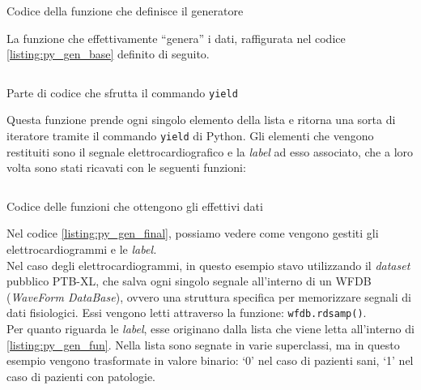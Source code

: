 \begin{listing}[H]
    \inputminted{python}{code/generator_fun.py}
    \caption{Codice della funzione che definisce il generatore}
    \label{listing:py_gen_fun}
\end{listing}\noindent
La funzione che effettivamente ``genera'' i dati, raffigurata nel codice \ref{listing:py_gen_base} definito di seguito.
\begin{listing}[H]
    \inputminted{python}{code/generator_base.py}
    \caption{Parte di codice che sfrutta il commando \texttt{yield}}
    \label{listing:py_gen_base}
\end{listing}\noindent
Questa funzione prende ogni singolo elemento della lista e ritorna una sorta di iteratore tramite il commando \texttt{yield} di Python.
Gli elementi che vengono restituiti sono il segnale elettrocardiografico e la \textit{label} ad esso associato, che a loro volta sono stati ricavati con le seguenti funzioni:
\begin{listing}[H]
    \inputminted{python}{code/generator_final.py}
    \caption{Codice delle funzioni che ottengono gli effettivi dati}
    \label{listing:py_gen_final}
\end{listing}\noindent
Nel codice \ref{listing:py_gen_final}, possiamo vedere come vengono gestiti gli elettrocardiogrammi e le \textit{label.}\\
Nel caso degli elettrocardiogrammi, in questo esempio stavo utilizzando il \textit{dataset} pubblico PTB-XL, che salva ogni singolo segnale all'interno di un WFDB (\textit{WaveForm DataBase}), ovvero una struttura specifica per memorizzare segnali di dati fisiologici. Essi vengono letti attraverso la funzione: \texttt{wfdb.rdsamp()}.\\
Per quanto riguarda le \textit{label}, esse originano dalla lista che viene letta all'interno di \ref{listing:py_gen_fun}. Nella lista sono segnate in varie superclassi, ma in questo esempio vengono trasformate in valore binario: `0' nel caso di pazienti sani, `1' nel caso di pazienti con patologie.

